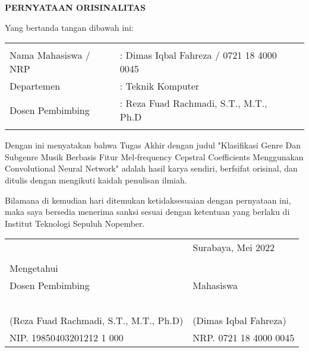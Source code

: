 \begin{center}
  \large
  \textbf{PERNYATAAN ORISINALITAS}
\end{center}

\thispagestyle{empty}

\vspace{2ex}


\noindent Yang bertanda tangan dibawah ini:

\noindent\begin{tabularx}{\textwidth}{X X l}
  & \\
  Nama Mahasiswa / NRP &: Dimas Iqbal Fahreza / 0721 18 4000 0045 \\
  Departemen &: Teknik Komputer \\
  Dosen Pembimbing &: Reza Fuad Rachmadi, S.T., M.T., Ph.D \\
  & \\
\end{tabularx}

Dengan ini menyatakan bahwa Tugas Akhir dengan judul "Klasifikasi Genre Dan Subgenre Musik Berbasis Fitur Mel-frequency Cepstral Coefficients Menggunakan Convolutional Neural Network" adalah hasil karya sendiri, berfsifat orisinal, dan ditulis dengan mengikuti kaidah penulisan ilmiah.

Bilamana di kemudian hari ditemukan ketidaksesuaian dengan pernyataan ini, maka saya bersedia menerima sanksi sesuai dengan ketentuan yang berlaku di Institut Teknologi Sepuluh Nopember.

\vspace{8ex}

\noindent\begin{tabularx}{\textwidth}{X l}
  & Surabaya, Mei 2022\\
  & \\
  Mengetahui & \\
  Dosen Pembimbing & Mahasiswa\\
  & \\
  & \\
  & \\
  & \\
  & \\
  (Reza Fuad Rachmadi, S.T., M.T., Ph.D) & (Dimas Iqbal Fahreza) \\
  NIP. 19850403201212 1 000& NRP. 0721 18 4000 0045\\
\end{tabularx}